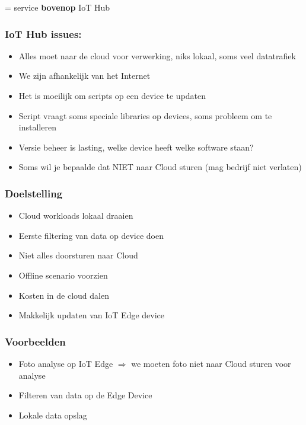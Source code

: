 \documentclass{article}
\newcommand{\bold}[1]{\textbf{#1}}
\begin{document}
= service \bold{bovenop} IoT Hub

\subsubsection{IoT Hub issues:}

\begin{itemize}
    \item Alles moet naar de cloud voor verwerking, niks lokaal, soms veel datatrafiek
    \item We zijn afhankelijk van het Internet
    \item Het is moeilijk om scripts op een device te updaten
    \item Script vraagt soms speciale libraries op devices, soms probleem om te installeren
    \item Versie beheer is lasting, welke device heeft welke software staan?
    \item Soms wil je bepaalde dat NIET naar Cloud sturen (mag bedrijf niet verlaten)
\end{itemize}

\subsubsection{Doelstelling}

\begin{itemize}
    \item Cloud workloads lokaal draaien
    \item Eerste filtering van data op device doen
    \item Niet alles doorsturen naar Cloud
    \item Offline scenario voorzien
    \item Kosten in de cloud dalen
    \item Makkelijk updaten van IoT Edge device
\end{itemize}

\subsubsection{Voorbeelden}

\begin{itemize}
    \item Foto analyse op IoT Edge $\Rightarrow$ we moeten foto niet naar Cloud sturen voor analyse
    \item Filteren van data op de Edge Device
    \item Lokale data opslag
\end{itemize}
\end{document}
